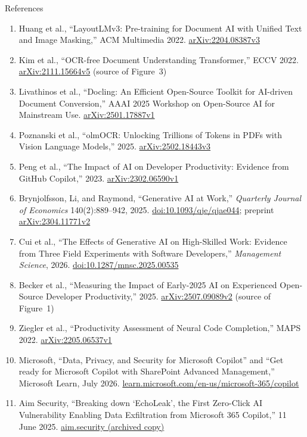 \begin{frame}[allowframebreaks]{References}
\begin{enumerate}
    \item Huang et al., ``LayoutLMv3: Pre-training for Document AI with Unified Text and Image Masking,'' ACM Multimedia 2022. \href{https://arxiv.org/abs/2204.08387v3}{arXiv:2204.08387v3}
    \item Kim et al., ``OCR-free Document Understanding Transformer,'' ECCV 2022. \href{https://arxiv.org/abs/2111.15664v5}{arXiv:2111.15664v5} (source of Figure~3)
    \item Livathinos et al., ``Docling: An Efficient Open-Source Toolkit for AI-driven Document Conversion,'' AAAI 2025 Workshop on Open-Source AI for Mainstream Use. \href{https://arxiv.org/abs/2501.17887v1}{arXiv:2501.17887v1}
    \item Poznanski et al., ``olmOCR: Unlocking Trillions of Tokens in PDFs with Vision Language Models,'' 2025. \href{https://arxiv.org/abs/2502.18443v3}{arXiv:2502.18443v3}
    \item Peng et al., ``The Impact of AI on Developer Productivity: Evidence from GitHub Copilot,'' 2023. \href{https://arxiv.org/abs/2302.06590v1}{arXiv:2302.06590v1}
    \item Brynjolfsson, Li, and Raymond, ``Generative AI at Work,'' \textit{Quarterly Journal of Economics} 140(2):889--942, 2025. \href{https://doi.org/10.1093/qje/qjae044}{doi:10.1093/qje/qjae044}; preprint \href{https://arxiv.org/abs/2304.11771v2}{arXiv:2304.11771v2}
    \item Cui et al., ``The Effects of Generative AI on High-Skilled Work: Evidence from Three Field Experiments with Software Developers,'' \textit{Management Science}, 2026. \href{https://doi.org/10.1287/mnsc.2025.00535}{doi:10.1287/mnsc.2025.00535}
    \item Becker et al., ``Measuring the Impact of Early-2025 AI on Experienced Open-Source Developer Productivity,'' 2025. \href{https://arxiv.org/abs/2507.09089v2}{arXiv:2507.09089v2} (source of Figure~1)
    \item Ziegler et al., ``Productivity Assessment of Neural Code Completion,'' MAPS 2022. \href{https://arxiv.org/abs/2205.06537v1}{arXiv:2205.06537v1}
    \item Microsoft, ``Data, Privacy, and Security for Microsoft Copilot'' and ``Get ready for Microsoft Copilot with SharePoint Advanced Management,'' Microsoft Learn, July 2026. \href{https://learn.microsoft.com/en-us/microsoft-365/copilot/microsoft-365-copilot-privacy}{learn.microsoft.com/en-us/microsoft-365/copilot}
    \item Aim Security, ``Breaking down `EchoLeak', the First Zero-Click AI Vulnerability Enabling Data Exfiltration from Microsoft 365 Copilot,'' 11 June 2025. \href{https://web.archive.org/web/20250612074812/https://www.aim.security/lp/aim-labs-echoleak-blogpost}{aim.security (archived copy)}

\end{enumerate}
\end{frame}
